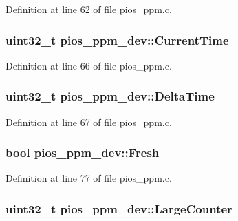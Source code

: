 \-Definition at line 62 of file pios\-\_\-ppm.\-c.

\hypertarget{structpios__ppm__dev_a789b591ce1dee1c69df37405c130cd91}{
\subsubsection[{\-Current\-Time}]{\setlength{\rightskip}{0pt plus 5cm}uint32\-\_\-t {\bf pios\-\_\-ppm\-\_\-dev\-::\-Current\-Time}}}\label{structpios__ppm__dev_a789b591ce1dee1c69df37405c130cd91}


\-Definition at line 66 of file pios\-\_\-ppm.\-c.

\hypertarget{structpios__ppm__dev_a551519de53d5ad750d8e360f4fcacd53}{
\subsubsection[{\-Delta\-Time}]{\setlength{\rightskip}{0pt plus 5cm}uint32\-\_\-t {\bf pios\-\_\-ppm\-\_\-dev\-::\-Delta\-Time}}}\label{structpios__ppm__dev_a551519de53d5ad750d8e360f4fcacd53}


\-Definition at line 67 of file pios\-\_\-ppm.\-c.

\hypertarget{structpios__ppm__dev_a276c9eba5e4511f04af792d37819f808}{
\subsubsection[{\-Fresh}]{\setlength{\rightskip}{0pt plus 5cm}bool {\bf pios\-\_\-ppm\-\_\-dev\-::\-Fresh}}}\label{structpios__ppm__dev_a276c9eba5e4511f04af792d37819f808}


\-Definition at line 77 of file pios\-\_\-ppm.\-c.

\hypertarget{structpios__ppm__dev_ac18ce6183b9943ec4bae05ec82c8b595}{
\subsubsection[{\-Large\-Counter}]{\setlength{\rightskip}{0pt plus 5cm}uint32\-\_\-t {\bf pios\-\_\-ppm\-\_\-dev\-::\-Large\-Counter}}}\label{structpios__ppm__dev_ac18ce6183b9943ec4bae05ec82c8b595}


